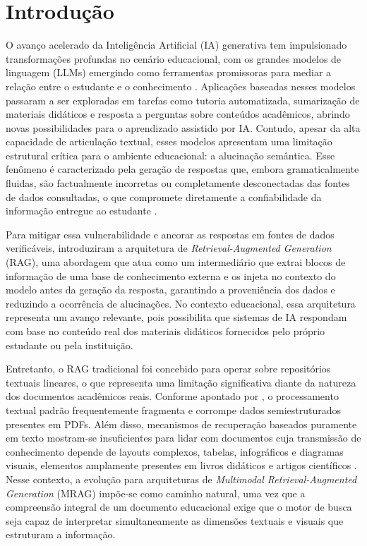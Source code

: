\chapter{Introdução}
\label{cap:introducao}

O avanço acelerado da Inteligência Artificial (IA) generativa tem impulsionado transformações profundas no cenário educacional, com os grandes modelos de linguagem (LLMs) emergindo como ferramentas promissoras para mediar a relação entre o estudante e o conhecimento . Aplicações baseadas nesses modelos passaram a ser exploradas em tarefas como tutoria automatizada, sumarização de materiais didáticos e resposta a perguntas sobre conteúdos acadêmicos, abrindo novas possibilidades para o aprendizado assistido por IA. Contudo, apesar da alta capacidade de articulação textual, esses modelos apresentam uma limitação estrutural crítica para o ambiente educacional: a alucinação semântica. Esse fenômeno é caracterizado pela geração de respostas que, embora gramaticalmente fluidas, são factualmente incorretas ou completamente desconectadas das fontes de dados consultadas, o que compromete diretamente a confiabilidade da informação entregue ao estudante .

Para mitigar essa vulnerabilidade e ancorar as respostas em fontes de dados verificáveis,  introduziram a arquitetura de \textit{Retrieval-Augmented Generation} (RAG), uma abordagem que atua como um intermediário que extrai blocos de informação de uma base de conhecimento externa e os injeta no contexto do modelo antes da geração da resposta, garantindo a proveniência dos dados e reduzindo a ocorrência de alucinações. No contexto educacional, essa arquitetura representa um avanço relevante, pois possibilita que sistemas de IA respondam com base no conteúdo real dos materiais didáticos fornecidos pelo próprio estudante ou pela instituição.

Entretanto, o RAG tradicional foi concebido para operar sobre repositórios textuais lineares, o que representa uma limitação significativa diante da natureza dos documentos acadêmicos reais. Conforme apontado por , o processamento textual padrão frequentemente fragmenta e corrompe dados semiestruturados presentes em PDFs. Além disso, mecanismos de recuperação baseados puramente em texto mostram-se insuficientes para lidar com documentos cuja transmissão de conhecimento depende de layouts complexos, tabelas, infográficos e diagramas visuais, elementos amplamente presentes em livros didáticos e artigos científicos . Nesse contexto, a evolução para arquiteturas de \textit{Multimodal Retrieval-Augmented Generation} (MRAG) impõe-se como caminho natural, uma vez que a compreensão integral de um documento educacional exige que o motor de busca seja capaz de interpretar simultaneamente as dimensões textuais e visuais que estruturam a informação.

